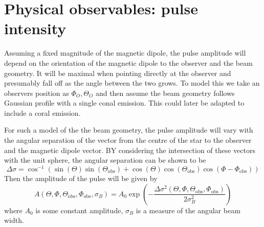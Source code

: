 \documentclass[../full_thesis/full_thesis.tex]{subfiles}
\begin{document}


\section{Physical observables: pulse intensity}
\label{sec: intensity}
Assuming a fixed magnitude of the magnetic dipole, the pulse amplitude will
depend on the orientation of the magnetic dipole to the observer and the
beam geometry. It will be
maximal when pointing directly at the observer and presumably fall off as the
angle between the two grows. To model this we take an observers position as
$\Phi_{O}, \Theta_{O}$ and then assume the beam geometry follows
Gaussian profile with a single conal emission. This could later be adapted
to include a coral emission.

For such a model of the the beam geometry, the pulse amplitude will vary with the
angular separation of the vector from the centre of the star to the observer and the
magnetic dipole vector. BY considering the intersection of these vectors with
the unit sphere, the angular separation can be shown to be
\newcommand{\ThetaO}{\Theta_{\mathrm{obs}}}
\newcommand{\PhiO}{\Phi_{\mathrm{obs}}}
\newcommand{\sigmaB}{\sigma_{B}}
\begin{equation}
\Delta\sigma = \cos^{-1}\left(\sin(\Theta)\sin(\ThetaO) +
                             \cos(\Theta)\cos(\ThetaO)\cos(\Phi - \PhiO)\right)
\label{eqn: angular sep inv cos}
\end{equation}
Then the amplitude of the pulse will be given by
\begin{equation}
A(\Theta, \Phi, \ThetaO, \PhiO, \sigmaB) =
A_{0} \exp\left(-\frac{\Delta\sigma^{2}(\Theta, \Phi, \ThetaO, \PhiO)}{2\sigmaB^{2}}\right)
\label{eqn: beam amplitude}
\end{equation}
where $A_{0}$ is some constant amplitude, $\sigmaB$ is a measure of the
angular beam width.
\end{document}
